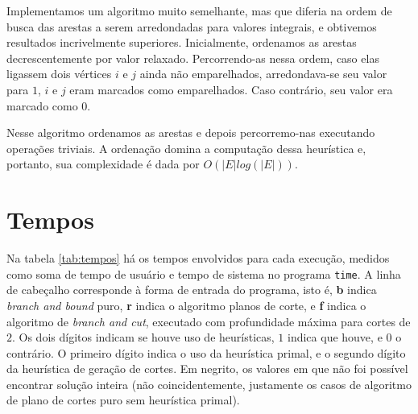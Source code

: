 \documentclass[11pt]{article}
\begin{document}
Implementamos um algoritmo muito semelhante, mas que diferia na ordem de
busca das arestas a serem arredondadas para valores integrais, e
obtivemos resultados incrivelmente superiores. Inicialmente, ordenamos
as arestas decrescentemente por valor relaxado. Percorrendo-as nessa
ordem, caso elas ligassem dois vértices $i$ e $j$ ainda não emparelhados,
arredondava-se seu valor para $1$, $i$ e $j$ eram marcados como
emparelhados. Caso contrário, seu valor era marcado como $0$. 

Nesse algoritmo ordenamos as arestas e depois percorremo-nas executando
operações triviais. A ordenação domina a computação dessa heurística e,
portanto, sua complexidade é dada por $O(|E| log (|E|))$.


\section{Tempos}

Na tabela \ref{tab:tempos} há os tempos envolvidos para cada execução,
medidos como soma de tempo de usuário e tempo de sistema no programa
\texttt{time}. A linha de cabeçalho corresponde à forma de entrada do
programa, isto é, \textbf{b} indica \emph{branch and bound} puro,
\textbf{r} indica o algoritmo planos de corte, e \textbf{f} indica o
algoritmo de \emph{branch and cut}, executado com profundidade máxima
para cortes de $2$. Os dois dígitos indicam se houve uso
de heurísticas, $1$ indica que houve, e $0$ o contrário. O primeiro
dígito indica o uso da heurística primal,  e o segundo dígito da
heurística de geração de cortes. Em negrito, os valores em que não foi
possível encontrar solução inteira (não coincidentemente, justamente os
casos de algoritmo de plano de cortes puro sem heurística primal).
\end{document}
